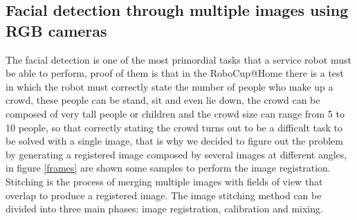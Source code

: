 \documentclass{llncs}
\begin{document}
\subsection{Facial detection through multiple images using RGB cameras}\label{subsec:FacialReco}
The facial detection is one of the most primordial tasks that a service robot must be able to perform, proof of them is that in the RoboCup@Home there is a test in which the robot must correctly state the number of people who make up a crowd, these people can  be stand, sit and even lie down, the crowd can be composed of very tall people or children and the crowd size can range from 5 to 10 people, so that correctly stating the crowd turns out to be a difficult task to be solved with a single image, that is why we decided to figure out the problem by generating a registered image composed by several images at different angles, in figure \ref {frames} are shown some samples to perform the image registration. Stitching is the process of merging multiple images with fields of view that overlap to produce a registered image. %
The image stitching method can be divided into three main phases: image registration, calibration and mixing.
\end{document}
